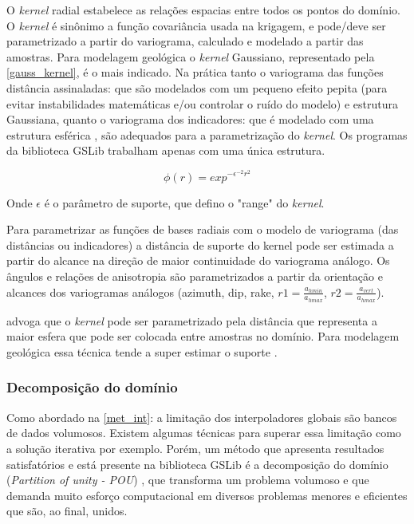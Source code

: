 O \textit{kernel} radial estabelece as relações espacias entre todos os pontos do domínio. O \textit{kernel} 
é sinônimo a função covariância usada na krigagem, e pode/deve ser parametrizado a partir do variograma, calculado e modelado a partir das amostras. Para modelagem geológica o \textit{kernel} Gaussiano, representado pela \autoref{gauss_kernel}, é o mais indicado. Na prática tanto o variograma das funções distância assinaladas: que são modelados com um pequeno efeito pepita (para evitar instabilidades matemáticas e/ou controlar o ruído do modelo) e estrutura Gaussiana, quanto o variograma dos indicadores: que é modelado com uma estrutura esférica \cite{martin2017implicitmodeling}, são adequados para a parametrização do \textit{kernel}. Os programas da biblioteca GSLib trabalham apenas com uma única estrutura. 

\begin{equation}\label{gauss_kernel}
  \phi(r)=exp^{-\epsilon^{-2}r^2}  
\end{equation}

Onde $\epsilon$ é o parâmetro de suporte, que defino o "range" do \textit{kernel}.

Para parametrizar as funções de bases radiais com o modelo de variograma (das distâncias ou indicadores) a distância de suporte do kernel pode ser estimada a partir do alcance na direção de maior continuidade do variograma análogo. Os ângulos e relações de anisotropia são parametrizados a partir da orientação e alcances dos variogramas análogos (azimuth, dip, rake, $r1 = \frac{a_{hmin}}{a_{hmax}}$, $r2 = \frac{a_{vert}}{a_{hmax}}$).

 advoga que o \textit{kernel} pode ser parametrizado pela distância que representa a maior esfera que pode ser colocada entre amostras no domínio. Para modelagem geológica essa técnica tende a super estimar o suporte \cite{martin2017implicitmodeling}.

\subsubsection{Decomposição do domínio} \label{dom_decomp}

Como abordado na \autoref{met_int}: a limitação dos interpoladores globais são bancos de dados volumosos. Existem algumas técnicas para superar essa limitação como a solução iterativa \cite{beatson1999fast} por exemplo. Porém, um método que apresenta resultados satisfatórios e está presente na biblioteca GSLib é a decomposição do domínio (\textit{Partition of unity - POU}) \cite{wendland2004scattered}, que transforma um problema volumoso e que demanda muito esforço computacional em diversos problemas menores e eficientes que são, ao final, unidos.

